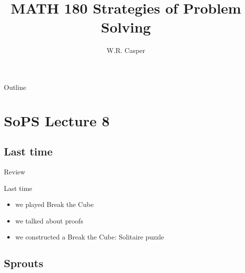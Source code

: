 \documentclass{beamer}
\title{MATH 180 Strategies of Problem Solving}
\subtitle
{} %
\author[W.R. Casper] %
{W.R. Casper}
\institute[California State University Fullerton] %
{
  Department of Mathematics\\
  California State University Fullerton}
\begin{document}
\begin{frame}
  \titlepage
\end{frame}

\begin{frame}{Outline}
  \tableofcontents
\end{frame}



\section{SoPS Lecture 8}

\subsection{Last time}


\begin{frame}{Review}
  \begin{block}{Last time}
    \begin{itemize}
\pause
      \item we played Break the Cube
\pause
      \item we talked about proofs
\pause
      \item we constructed a Break the Cube: Solitaire puzzle
    \end{itemize}
  \end{block}
\end{frame}

\subsection{Sprouts}
\end{document}

